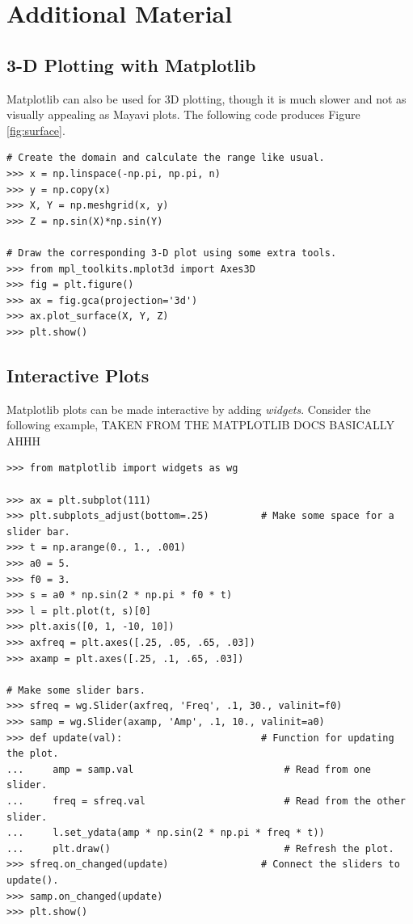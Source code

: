 \newpage

\section*{Additional Material} %

\subsection*{3-D Plotting with Matplotlib} %

Matplotlib can also be used for 3D plotting, though it is much slower and not as visually appealing as Mayavi plots.
The following code produces Figure \ref{fig:surface}.

\begin{lstlisting}
# Create the domain and calculate the range like usual.
>>> x = np.linspace(-np.pi, np.pi, n)
>>> y = np.copy(x)
>>> X, Y = np.meshgrid(x, y)
>>> Z = np.sin(X)*np.sin(Y)

# Draw the corresponding 3-D plot using some extra tools.
>>> from mpl_toolkits.mplot3d import Axes3D
>>> fig = plt.figure()
>>> ax = fig.gca(projection='3d')
>>> ax.plot_surface(X, Y, Z)
>>> plt.show()
\end{lstlisting}

\subsection*{Interactive Plots} %

Matplotlib plots can be made interactive by adding \emph{widgets}.
Consider the following example, TAKEN FROM THE MATPLOTLIB DOCS BASICALLY AHHH

\begin{lstlisting}
>>> from matplotlib import widgets as wg

>>> ax = plt.subplot(111)
>>> plt.subplots_adjust(bottom=.25)         # Make some space for a slider bar.
>>> t = np.arange(0., 1., .001)
>>> a0 = 5.
>>> f0 = 3.
>>> s = a0 * np.sin(2 * np.pi * f0 * t)
>>> l = plt.plot(t, s)[0]
>>> plt.axis([0, 1, -10, 10])
>>> axfreq = plt.axes([.25, .05, .65, .03])
>>> axamp = plt.axes([.25, .1, .65, .03])

# Make some slider bars.
>>> sfreq = wg.Slider(axfreq, 'Freq', .1, 30., valinit=f0)
>>> samp = wg.Slider(axamp, 'Amp', .1, 10., valinit=a0)
>>> def update(val):                        # Function for updating the plot.
...     amp = samp.val                          # Read from one slider.
...     freq = sfreq.val                        # Read from the other slider.
...     l.set_ydata(amp * np.sin(2 * np.pi * freq * t))
...     plt.draw()                              # Refresh the plot.
>>> sfreq.on_changed(update)                # Connect the sliders to update().
>>> samp.on_changed(update)
>>> plt.show()
\end{lstlisting}

